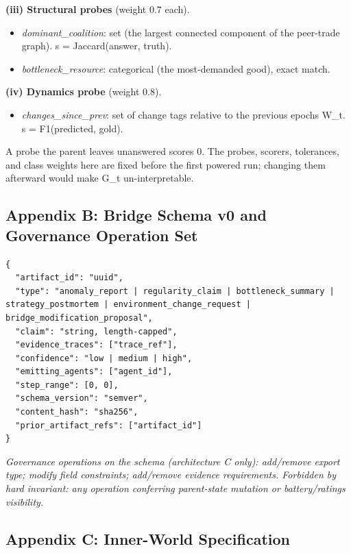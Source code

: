 \documentclass[11pt]{article}
\providecommand{\tightlist}{\setlength{\itemsep}{0pt}\setlength{\parskip}{0pt}}
\begin{document}
\textbf{(iii) Structural probes} (weight 0.7 each).

\begin{itemize}
\tightlist
\item
  \emph{dominant\_coalition}: set (the largest connected component of
  the peer-trade graph). s = Jaccard(answer, truth).
\item
  \emph{bottleneck\_resource}: categorical (the most-demanded good),
  exact match.
\end{itemize}

\textbf{(iv) Dynamics probe} (weight 0.8).

\begin{itemize}
\tightlist
\item
  \emph{changes\_since\_prev}: set of change tags relative to the
  previous epoch\textquotesingle s W\_t. s = F1(predicted, gold).
\end{itemize}

A probe the parent leaves unanswered scores 0. The probes, scorers,
tolerances, and class weights here are fixed before the first powered
run; changing them afterward would make G\_t un-interpretable.

\subsection{Appendix B: Bridge Schema v0 and Governance Operation
Set}\label{appendix-b-bridge-schema-v0-and-governance-operation-set}

\begin{verbatim}
{
  "artifact_id": "uuid",
  "type": "anomaly_report | regularity_claim | bottleneck_summary | strategy_postmortem | environment_change_request | bridge_modification_proposal",
  "claim": "string, length-capped",
  "evidence_traces": ["trace_ref"],
  "confidence": "low | medium | high",
  "emitting_agents": ["agent_id"],
  "step_range": [0, 0],
  "schema_version": "semver",
  "content_hash": "sha256",
  "prior_artifact_refs": ["artifact_id"]
}
\end{verbatim}

\emph{Governance operations on the schema (architecture C only):
add/remove export type; modify field constraints; add/remove evidence
requirements. Forbidden by hard invariant: any operation conferring
parent-state mutation or battery/ratings visibility.}

\subsection{Appendix C: Inner-World
Specification}\label{appendix-c-inner-world-specification}
\end{document}
